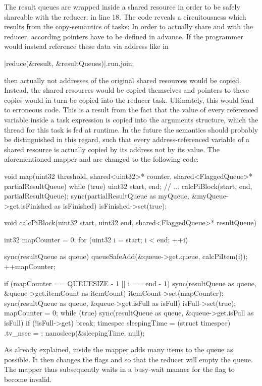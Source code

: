 The result queues are wrapped inside a shared resource in order to be safely shareable with the reducer. in line 18. The code reveals a circuitousness which results from the copy-semantics of tasks: In order to actually share  and  with the reducer, according pointers have to be defined in advance. If the programmer would instead reference these data via address like in
\begin{ccode}
|reduce(&result, &resultQueues)|.run.join; 
\end{ccode}
then actually not addresses of the original shared resources would be copied. Instead, the shared resources would be copied themselves and pointers to these copies would in turn be copied into the reducer task. Ultimately, this would lead to erroneous code. This is a result from the fact that the value of every referenced variable inside a task expression is copied into the arguments structure, which the thread for this task is fed at runtime. In the future the semantics should probably be distinguished in this regard, such that every address-referenced variable of a shared resource is actually copied by its address not by its value. The aforementioned mapper and  are changed to the following code:
\begin{ccode}
void map(uint32 threshold, shared<uint32>* counter, shared<FlaggedQueue>* partialResultQueue) { 
  while (true) { 
    uint32 start, end; 
    // ...     
    calcPiBlock(start, end, partialResultQueue); 
  } 
  sync(partialResultQueue as myQueue, &myQueue->get.isFinished as isFinished) { isFinished->set(true); } 
}

void calcPiBlock(uint32 start, uint32 end, shared<FlaggedQueue>* resultQueue) { 
  int32 mapCounter = 0; 
  for (uint32 i = start; i < end; ++i) {
    sync(resultQueue as queue) { queueSafeAdd(&queue->get.queue, calcPiItem(i)); } 
    ++mapCounter; 
     
    if (mapCounter == QUEUESIZE - 1 || i == end - 1) { 
      sync(resultQueue as queue, &queue->get.itemCount as itemCount) { itemCount->set(mapCounter); } 
      sync(resultQueue as queue, &queue->get.isFull as isFull) { isFull->set(true); } 
      mapCounter = 0; 
      while (true) { 
        sync(resultQueue as queue, &queue->get.isFull as isFull) { if (!isFull->get) { break; } } 
        timespec sleepingTime = (struct timespec){ .tv_nsec = }; 
        nanosleep(&sleepingTime, null); 
      }
    }
  }
}
\end{ccode}
As already explained, inside  the mapper adds many items to the queue as possible. It then changes the flags  and  so that the reducer will empty the queue. The mapper thus subsequently waits in a busy-wait manner for the  flag to become invalid.

